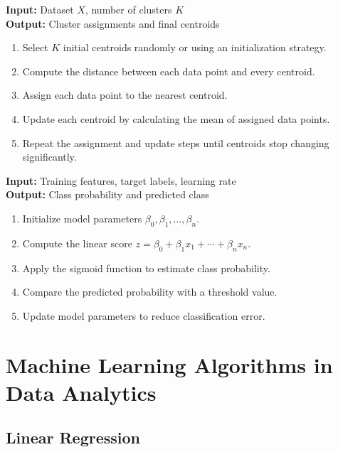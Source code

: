\documentclass[11pt,a4paper]{article}
\begin{document}
\begin{tcolorbox}[colback=prismlight,colframe=prismblue,title=K-Means Clustering Algorithm]
\textbf{Input:} Dataset $X$, number of clusters $K$\\[1mm]
\textbf{Output:} Cluster assignments and final centroids
\begin{enumerate}
    \item Select $K$ initial centroids randomly or using an initialization strategy.
    \item Compute the distance between each data point and every centroid.
    \item Assign each data point to the nearest centroid.
    \item Update each centroid by calculating the mean of assigned data points.
    \item Repeat the assignment and update steps until centroids stop changing significantly.
\end{enumerate}
\end{tcolorbox}

\begin{tcolorbox}[colback=prismlight,colframe=prismcyan,title=Logistic Regression Classification Algorithm]
\textbf{Input:} Training features, target labels, learning rate\\[1mm]
\textbf{Output:} Class probability and predicted class
\begin{enumerate}
    \item Initialize model parameters $\beta_0, \beta_1, \ldots, \beta_n$.
    \item Compute the linear score $z=\beta_0+\beta_1x_1+\cdots+\beta_nx_n$.
    \item Apply the sigmoid function to estimate class probability.
    \item Compare the predicted probability with a threshold value.
    \item Update model parameters to reduce classification error.
\end{enumerate}
\end{tcolorbox}


\section{Machine Learning Algorithms in Data Analytics}

\subsection{Linear Regression}
\end{document}
